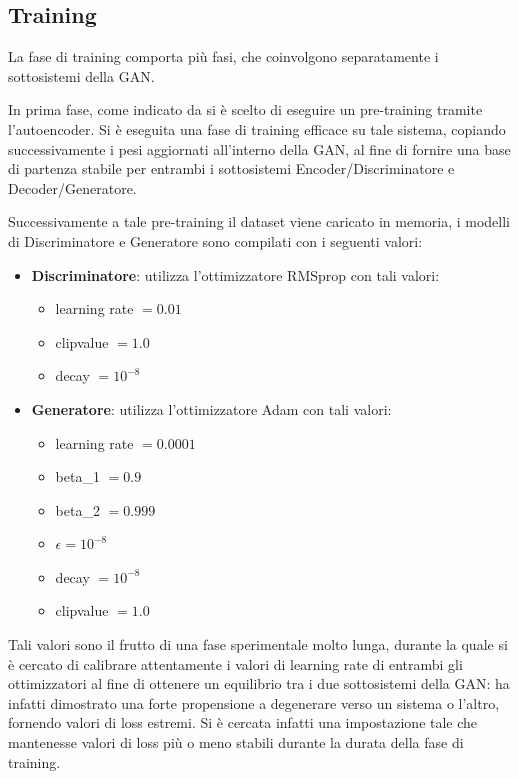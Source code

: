 \pagebreak


\newpage
\subsection{Training}
La fase di training comporta più fasi, che coinvolgono separatamente i sottosistemi della GAN.

In prima fase, come indicato da \cite{deepdga} si è scelto di eseguire un pre-training tramite l'autoencoder. Si è eseguita una fase di training efficace su tale sistema, copiando successivamente i pesi aggiornati all'interno della GAN, al fine di fornire una base di partenza stabile per entrambi i sottosistemi Encoder/Discriminatore e Decoder/Generatore.

Successivamente a tale pre-training il dataset viene caricato in memoria, i modelli di Discriminatore e Generatore sono compilati con i seguenti valori: 
\begin{itemize}
	\item \textbf{Discriminatore}: utilizza l'ottimizzatore RMSprop \cite{rmsprop} con tali valori: 
		\begin{itemize}
			\item learning rate $= 0.01$ 
			\item clipvalue $= 1.0$
			\item decay $= 10^{-8}$
		\end{itemize}
	\item \textbf{Generatore}: utilizza l'ottimizzatore Adam con tali valori:
	\begin{itemize}
		\item learning rate $= 0.0001$
		\item beta\_1 $= 0.9$
		\item beta\_2 $= 0.999$
		\item $\epsilon = 10^{-8}$
		\item decay $= 10^{-8}$
		\item clipvalue  $= 1.0$
	\end{itemize}
\end{itemize}

Tali valori sono il frutto di una fase sperimentale molto lunga, durante la quale si è cercato di calibrare attentamente i valori di learning rate di entrambi gli ottimizzatori al fine di ottenere un equilibrio tra i due sottosistemi della GAN: ha infatti dimostrato una forte propensione a degenerare verso un sistema o l'altro, fornendo valori di loss estremi. Si è cercata infatti una impostazione tale che mantenesse valori di loss più o meno stabili durante la durata della fase di training.

